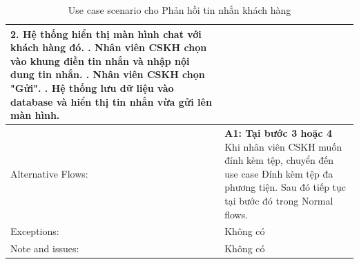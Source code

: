 \begin{table}[H]
\begin{tabular}{|l|l|l|l|}
{        2. Hệ thống hiển thị màn hình chat với khách hàng đó. \newline
        3. Nhân viên CSKH chọn vào khung điền tin nhắn và nhập nội dung tin nhắn. \newline
        4. Nhân viên CSKH chọn "Gửi". \newline
        5. Hệ thống lưu dữ liệu vào database và hiển thị tin nhắn vừa gửi lên màn hình.} \\
        \hline
        Alternative Flows: & \multicolumn{3}{|p{12cm}|}{\textbf{A1: Tại bước 3 hoặc 4} \newline
        Khi nhân viên CSKH muốn đính kèm tệp, chuyển đến use case Đính kèm tệp đa phương tiện. Sau đó tiếp tục tại bước đó trong Normal flows.} \\
        \hline
        Exceptions: & \multicolumn{3}{|p{12cm}|}{Không có} \\
        \hline
        Note and issues: & \multicolumn{3}{|p{12cm}|}{Không có} \\
        \hline
    \end{tabular}
    \caption{Use case scenario cho Phản hồi tin nhắn khách hàng}
\end{table}

